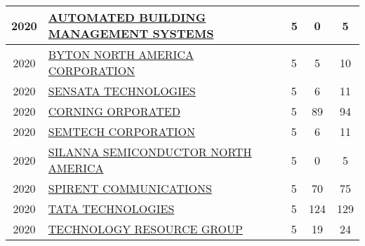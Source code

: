 \documentclass{article}%
\begin{document}
\begin{longtable}{c|p{20em}|p{5em}|c|c}
\hline%
2020&\hyperref[subsec:AUTOMATEDBUILDINGMANAGEMENTSYSTEMS]{AUTOMATED BUILDING MANAGEMENT SYSTEMS}&5&0&5\\%
\hline%
2020&\hyperref[subsec:BYTONNORTHAMERICACORPORATION]{BYTON NORTH AMERICA CORPORATION}&5&5&10\\%
\hline%
2020&\hyperref[subsec:SENSATATECHNOLOGIES]{SENSATA TECHNOLOGIES}&5&6&11\\%
\hline%
2020&\hyperref[subsec:CORNINGORPORATED]{CORNING ORPORATED}&5&89&94\\%
\hline%
2020&\hyperref[subsec:SEMTECHCORPORATION]{SEMTECH CORPORATION}&5&6&11\\%
\hline%
2020&\hyperref[subsec:SILANNASEMICONDUCTORNORTHAMERICA]{SILANNA SEMICONDUCTOR NORTH AMERICA}&5&0&5\\%
\hline%
2020&\hyperref[subsec:SPIRENTCOMMUNICATIONS]{SPIRENT COMMUNICATIONS}&5&70&75\\%
\hline%
2020&\hyperref[subsec:TATATECHNOLOGIES]{TATA TECHNOLOGIES}&5&124&129\\%
\hline%
2020&\hyperref[subsec:TECHNOLOGYRESOURCEGROUP]{TECHNOLOGY RESOURCE GROUP}&5&19&24\\%
\hline%
\end{longtable}

%
\newpage%
\end{document}
